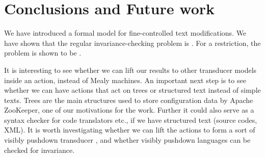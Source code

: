 \documentclass[12pt, a4paper]{article}
\begin{document}

\section{Conclusions and Future work}

We have introduced a formal model for fine-controlled text modifications.
We have shown that the regular invariance-checking problem is \pspc.
For a restriction, the problem is shown to be \conpc.

It is interesting to see whether we can lift our results to other
transducer models inside an action, instead of Mealy machines. 
An important next step is to see whether we can have actions that act 
on trees or structured text instead of simple texts. Trees are the main 
structures used to store configuration data by Apache ZooKeeper, one 
of our motivations for the work. Further it could also serve as a syntax 
checker for code translators etc., if we have structured text (source 
codes, XML). It is worth investigating whether we can lift the actions to 
form a sort of  visibly pushdown transducer \cite{FRRST2018}, and 
whether visibly pushdown languages \cite{AM2004} can be checked for 
invariance.



\newpage


\end{document}
